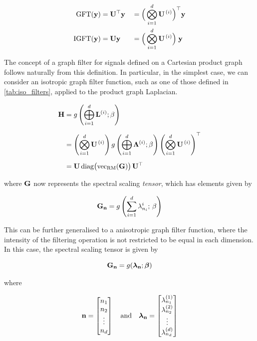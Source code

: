 \begin{alignat}{2}
\label{eq:gft}
    \text{GFT}(\mathbf{y}) & = \mathbf{U}^\top \mathbf{y} && = \Big(  \bigotimes_{i=1}^d  \mathbf{U}^{\,(i)} \Big)^\top \mathbf{y} \\
\label{eq:igft}
    \text{IGFT}(\mathbf{y}) & = \mathbf{U} \mathbf{y} && = \Big(  \bigotimes_{i=1}^d  \mathbf{U}^{\,(i)} \Big) \; \mathbf{y} 
\end{alignat}

The concept of a graph filter for signals defined on a Cartesian product graph follows naturally from this definition. In particular, in the simplest case, we can consider an isotropic graph filter function, such as one of those defined in \cref{tab:iso_filters}, applied to the product graph Laplacian. 

\begin{align}
    \mathbf{H} &= g\left(\bigoplus_{i=1}^d  \mathbf{L}^{(i)}; \beta\right) \notag \\[0.2cm]
        &= \left( \bigotimes_{i=1}^d  \mathbf{U}^{\,(i)} \right) g\left(\bigoplus_{i=1}^d \mathbf{\Lambda}^{(i)}; \beta \right) \left(\bigotimes_{i=1}^d  \mathbf{U}^{\,(i)} \right)^\top \notag \\[0.2cm]
        &= \mathbf{U} \, \text{\textup{diag}}\big(\text{\textup{vec}}_{\text{\textup{RM}}}(\mathbf{G})\big) \, \mathbf{U}^\top
\end{align}

where $\mathbf{G}$ now represents the spectral scaling \textit{tensor}, which has elements given by 

\begin{equation}
    \mathbf{G}_{\mathbf{n}} = g\left(\sum_{i=1}^d \lambda^{i}_{n_i}; \, \beta\right)
\end{equation}

This can be further generalised to a anisotropic graph filter function, where the intensity of the filtering operation is not restricted to be equal in each dimension. In this case, the spectral scaling tensor is given by 

\begin{equation}
    \mathbf{G}_{\mathbf{n}} = g(\boldsymbol{\lambda}_{\mathbf{n}}; \boldsymbol{\beta})
\end{equation}

where 

$$
\mathbf{n} = \begin{bmatrix}
    n_1 \\ n_2 \\ \vdots \\ n_d
\end{bmatrix}
\quad \text{and} \quad \boldsymbol{\lambda}_{\mathbf{n}} = 
\begin{bmatrix}
    \lambda^{(1)}_{n_1} \\ \lambda^{(2)}_{n_2} \\ \vdots \\ \lambda^{(d)}_{n_d}    
\end{bmatrix}
$$


